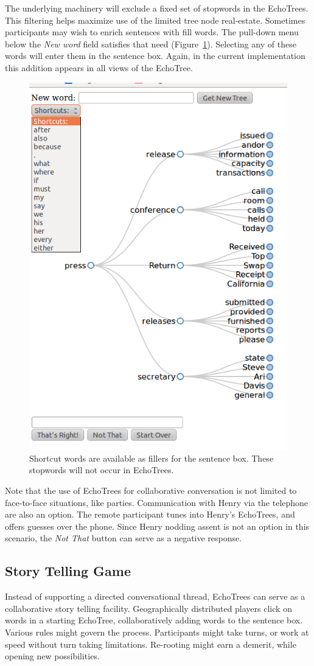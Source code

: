 \documentclass{sigchi}
\begin{document}
The underlying machinery will exclude a fixed set of stopwords in the
EchoTrees. This filtering helps maximize use of the limited tree node
real-estate. Sometimes participants may wish to enrich sentences with
fill words. The pull-down menu below the {\em New word} field
satisfies that need (Figure~\ref{fig:shortcuts}). Selecting any of
these words will enter them in the sentence box. Again, in the current
implementation this addition appears in all views of the EchoTree.
\begin{figure}
   \centering
   \includegraphics[width=0.4\columnwidth]{Figs/echoTreePulldownSnapshotSmall.png}
   \caption{Shortcut words are available as fillers for the sentence
     box. These stopwords will not occur in EchoTrees.}
   \label{fig:shortcuts}
\end{figure}
Note that the use of EchoTrees for collaborative conversation is not
limited to face-to-face situations, like parties. Communication
with Henry via the telephone are also an option. The remote
participant tunes into Henry's EchoTrees, and offers guesses over the
phone. Since Henry nodding assent is not an option in this scenario,
the {\em Not That} button can serve as a negative response.

\subsection{Story Telling Game}
Instead of supporting a directed conversational thread, EchoTrees can
serve as a collaborative story telling facility. Geographically
distributed players click on words in a starting EchoTree,
collaboratively adding words to the sentence box. Various rules might
govern the process. Participants might take turns, or work at speed
without turn taking limitations. Re-rooting might earn a demerit,
while opening new possibilities.
\end{document}
